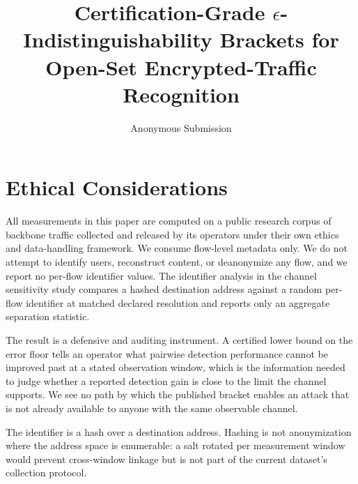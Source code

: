 \documentclass[sigconf,anonymous,review]{acmart}
\title{Certification-Grade $\epsilon$-Indistinguishability Brackets for Open-Set Encrypted-Traffic Recognition}
\author{Anonymous Submission}
\begin{document}



\maketitle
















\appendix

\clearpage
\section*{Ethical Considerations}

All measurements in this paper are computed on a public research corpus of
backbone traffic collected and released by its operators under their own ethics
and data-handling framework. We consume flow-level metadata only. We do not
attempt to identify users, reconstruct content, or deanonymize any flow, and we
report no per-flow identifier values. The identifier analysis in the channel
sensitivity study compares a hashed destination address against a random
per-flow identifier at matched declared resolution and reports only an aggregate
separation statistic.

The result is a defensive and auditing instrument. A certified lower bound on
the error floor tells an operator what pairwise detection performance cannot be
improved past at a stated observation window, which is the information needed to
judge whether a reported detection gain is close to the limit the channel
supports. We see no path by which the published bracket enables an attack that is
not already available to anyone with the same observable channel.

The identifier is a hash over a destination address. Hashing is not
anonymization where the address space is enumerable: a salt rotated per
measurement window would prevent cross-window linkage but is not part of the
current dataset's collection protocol.

\clearpage
\end{document}
